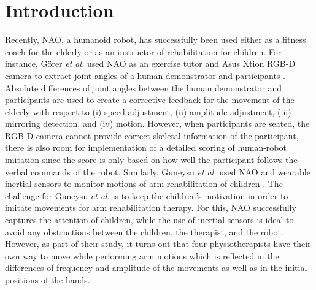 \documentclass{sig-alternate-05-2015}
\begin{document}


%
%

%
%
\printccsdesc



\section{Introduction}
Recently, NAO, a humanoid robot, has successfully been used either as a fitness coach for the elderly 
or as an instructor of rehabilitation for children.
For instance, G{\"{o}}rer \textit{et al.} used NAO as an exercise tutor
and Asus Xtion RGB-D camera to extract joint angles of a human demonstrator and participants \cite{Gorer2016}.
Absolute differences of joint angles between the human demonstrator and participants
are used to create a corrective feedback for the movement of the elderly 
with respect to (i) speed adjustment, (ii) amplitude adjustment, (iii) mirroring detection, and (iv) motion.
However, when participants are seated, the RGB-D camera cannot provide correct skeletal information
of the participant,
there is also room for implementation of a detailed scoring of human-robot imitation
since the score is only based on how well the participant follows the verbal commands of the robot.
Similarly, Guneysu \textit{et al.} used NAO and wearable inertial sensors
to monitor motions of arm rehabilitation of children \cite{Guneysu2015}.
The challenge for Guneysu \textit{et al.} is to keep the children's motivation in order to imitate 
movements for arm rehabilitation therapy. 
For this, NAO successfully captures the attention of children,
while the use of inertial sensors is ideal to avoid any  
obstructions between the children, the therapist, and  the robot.
However, as part of their study, it turns out that four physiotherapists have their own way to move
while performing
arm motions
which is reflected in the differences of frequency and amplitude of the movements
as well as in the initial positions of the hands.
\end{document}
